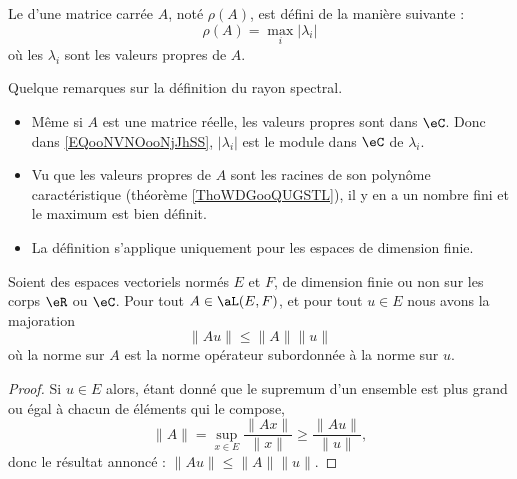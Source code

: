 \begin{definition}      \label{DEFooEAUKooSsjqaL}
    Le  d'une matrice carrée $A$, noté $\rho(A)$, est défini de la manière suivante :
    \begin{equation}    \label{EQooNVNOooNjJhSS}
        \rho(A)=\max_i|\lambda_i|
    \end{equation}
    où les $\lambda_i$ sont les valeurs propres de $A$.
\end{definition}

\begin{normaltext}
    Quelque remarques sur la définition du rayon spectral.
    \begin{itemize}
        \item 
             Même si \( A\) est une matrice réelle, les valeurs propres sont dans \( \eC\). Donc dans \eqref{EQooNVNOooNjJhSS}, \( | \lambda_i |\) est le module dans \( \eC\) de \( \lambda_i\).
        \item
            Vu que les valeurs propres de \( A\) sont les racines de son polynôme caractéristique (théorème \ref{ThoWDGooQUGSTL}), il y en a un nombre fini et le maximum est bien définit.
        \item
            La définition s'applique uniquement pour les espaces de dimension finie.
    \end{itemize}
\end{normaltext}

\begin{lemma}       \label{LEMooIBLEooLJczmu}
    Soient des espaces vectoriels normés \( E\) et \( F\), de dimension finie ou non sur les corps \( \eR\) ou \( \eC\). Pour tout \( A\in \aL(E,F)\), et pour tout \( u\in E\) nous avons la majoration
    \begin{equation}
        \| Au \|\leq \| A \|\| u \|
    \end{equation}
    où la norme sur \( A\) est la norme opérateur subordonnée à la norme sur \( u\).
\end{lemma}

\begin{proof}
    Si \( u\in E\) alors, étant donné que le supremum d'un ensemble est plus grand ou égal à chacun de éléments qui le compose,
    \begin{equation}
        \| A \|=\sup_{x\in E}\frac{ \| Ax \| }{ \| x \| }\geq \frac{ \| Au \| }{ \| u \| },
    \end{equation}
    donc le résultat annoncé : \( \| Au \|\leq \| A \|\| u \|\).
\end{proof}

